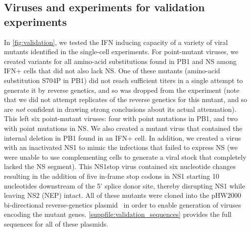 \documentclass[10pt,letterpaper]{article}
\newcommand{\FIG}[1]{\autoref{fig:#1}}
\newcommand{\SUPPFILE}[1]{\autoref{suppfile:#1}}
\begin{document}
\subsection*{Viruses and experiments for validation experiments}
In \FIG{validation}, we tested the IFN inducing capacity of a variety of viral mutants identified in the single-cell experiments.
For point-mutant viruses, we created variants for all amino-acid substitutions found in PB1 and NS among IFN+ cells that did not also lack NS.
One of these mutants (amino-acid substitution S704P in PB1) did not reach sufficient titers in a single attempt to generate it by reverse genetics, and so was dropped from the experiment (note that we did not attempt replicates of the reverse genetics for this mutant, and so are \emph{not} confident in drawing strong conclusions about its actual attenuation).
This left six point-mutant viruses: four with point mutations in PB1, and two with point mutations in NS.
We also created a mutant virus that contained the internal deletion in PB1 found in an IFN+ cell.
In addition, we created a virus with an inactivated NS1 to mimic the infections that failed to express NS (we were unable to use complementing cells to generate a viral stock that completely lacked the NS segment).
This NS1stop virus contained six nucleotide changes resulting in the addition of five in-frame stop codons in NS1 starting 10 nucleotides downstream of the 5' splice donor site, thereby disrupting NS1 while leaving NS2 (NEP) intact.
All of these mutants were cloned into the pHW2000 bi-directional reverse-genetics plasmid~\cite{hoffmann2000dna} in order to enable generation of viruses encoding the mutant genes.
 \SUPPFILE{validation_sequences} provides the full sequences for all of these plasmids.
\end{document}
